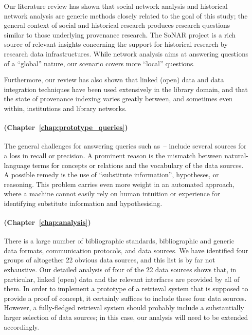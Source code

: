Our literature review has shown that
social network analysis and historical network analysis are generic methods closely related to the goal of this study;
the general context of social and historical research produces research questions similar to
those underlying provenance research.
The SoNAR project is a rich source of relevant insights concerning the support for historical research
by research data infrastructures.
While network analysis aims at answering questions of a \enquote{global} nature,
our scenario covers more \enquote{local} questions.

\pagebreak

Furthermore, our review has also shown that
linked (open) data and data integration techniques have been used extensively in the library domain,
and that the state of provenance indexing varies greatly between, and sometimes even within,
institutions and library networks.

\paragraph{\RQ[2] (Chapter~\ref{chap:prototype_queries})}

The general challenges for answering queries such as~--
include several sources for a loss in recall or precision.
A prominent reason is the mismatch between natural-language terms for concepts or relations
and the vocabulary of the data sources.
A possible remedy is the use of \enquote{substitute information}, hypotheses, or reasoning.
This problem carries even more weight in an automated approach, where
a machine cannot easily rely on human intuition or experience for identifying substitute information
and hypothesising.

\paragraph{\RQ[3] (Chapter~\ref{chap:analysis})}

There is a large number of bibliographic standards, bibliographic and generic data formats,
communication protocols, and data sources. We have identified four groups of altogether 22
obvious data sources, and this list is by far not exhaustive. Our detailed analysis of four
of the 22 data sources shows that, in particular, linked (open) data and the relevant
interfaces are provided by all of them. 
In order to implement a prototype of a retrieval system that is supposed to provide a proof of concept,
it certainly suffices to include these four data sources.
However, a fully-fledged retrieval system should probably include a substantially larger selection of data sources;
in this case, our analysis will need to be extended accordingly.

